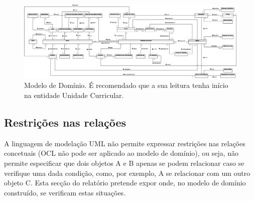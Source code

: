 \documentclass[12pt, a4paper]{article}
\begin{document}
\begingroup
    \begin{landscape}
        \thispagestyle{empty}

        \begin{figure}
            \centering
            \includegraphics[scale=0.44]{Imagens/Modelos/ModeloDominio.svg.eps}
            \caption{Modelo de Domínio. É recomendado que a sua leitura tenha início na entidade
                Unidade Curricular.}
        \end{figure}
    \end{landscape}
\endgroup

\subsection{Restrições nas relações}

A linguagem de modelação UML não permite expressar restrições nas relações concetuais (OCL não pode
ser aplicado ao modelo de domínio), ou seja, não permite especificar que dois objetos A e B apenas
se podem relacionar caso se verifique uma dada condição, como, por exemplo, A se relacionar com um
outro objeto C. Esta secção do relatório pretende expor onde, no modelo de domínio construído, se
verificam estas situações.
\end{document}
